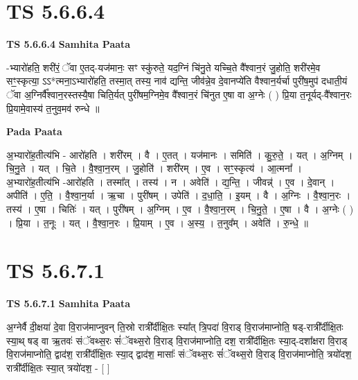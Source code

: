 \documentclass[17pt]{extarticle}
\begin{document}
\section*{ TS 5.6.6.4 }

\textbf{TS 5.6.6.4 } \newline
\textbf{Samhita Paata} \newline

-भ्यारो॑हति॒ शरी॑रं॒ ॅवा ए॒तद्-यज॑मानः॒ सꣳ स्कु॑रुते॒ यद॒ग्निं चि॑नु॒ते यच्चि॒ते वै᳚श्वान॒रं जु॒होति॒ शरी॑रमे॒व सꣳ॒॒स्कृत्या॒ ऽऽ*त्मना॒ऽभ्यारो॑हति॒ तस्मा॒त् तस्य॒ नाव॑ द्यन्ति॒ जीव॑न्ने॒व दे॒वानप्ये॑ति वैश्वान॒र्यर्चा पुरी॑ष॒मुप॑ दधाती॒यं ॅवा अ॒ग्निर्वै᳚श्वान॒रस्तस्यै॒षा चिति॒र्यत् पुरी॑षम॒ग्निमे॒व वै᳚श्वान॒रं चि॑नुत ए॒षा वा अ॒ग्नेः ( ) प्रि॒या त॒नूर्यद्-वै᳚श्वान॒रः प्रि॒यामे॒वास्य॑ त॒नुव॒मव॑ रुन्धे ॥ \newline

\textbf{Pada Paata} \newline

अ॒भ्यारो॑ह॒तीत्य॑भि - आरो॑हति । शरी॑रम् । वै । ए॒तत् । यज॑मानः । समिति॑ । कु॒रु॒ते॒ । यत् । अ॒ग्निम् । चि॒नु॒ते । यत् । चि॒ते । वै॒श्वा॒न॒रम् । जु॒होति॑ । शरी॑रम् । ए॒व । सꣳ॒॒स्कृत्य॑ । आ॒त्मना᳚ । अ॒भ्यारो॑ह॒तीत्य॑भि -आरो॑हति । तस्मा᳚त् । तस्य॑ । न । अवेति॑ । द्य॒न्ति॒ । जीवन्न्॑ । ए॒व । दे॒वान् । अपीति॑ । ए॒ति॒ । वै॒श्वा॒न॒र्या । ऋ॒चा । पुरी॑षम् । उपेति॑ । द॒धा॒ति॒ । इ॒यम् । वै । अ॒ग्निः । वै॒श्वा॒न॒रः । तस्य॑ । ए॒षा । चितिः॑ । यत् । पुरी॑षम् । अ॒ग्निम् । ए॒व । वै॒श्वा॒न॒रम् । चि॒नु॒ते॒ । ए॒षा । वै । अ॒ग्नेः ( ) । प्रि॒या । त॒नूः । यत् । वै॒श्वा॒न॒रः । प्रि॒याम् । ए॒व । अ॒स्य॒ । त॒नुव᳚म् । अवेति॑ । रु॒न्धे॒ ॥  \newline




\section*{ TS 5.6.7.1 }

\textbf{TS 5.6.7.1 } \newline
\textbf{Samhita Paata} \newline

अ॒ग्नेर्वै दी॒क्षया॑ दे॒वा वि॒राज॑माप्नुवन् ति॒स्रो रात्री᳚र्दीक्षि॒तः स्या᳚त् त्रि॒पदा॑ वि॒राड् वि॒राज॑माप्नोति॒ षड्-रात्री᳚र्दीक्षि॒तः स्या॒थ् षड् वा ऋ॒तवः॑ संॅवथ्स॒रः सं॑ॅवथ्स॒रो वि॒राड् वि॒राज॑माप्नोति॒ दश॒ रात्री᳚र्दीक्षि॒तः स्या॒द्-दशा᳚क्षरा वि॒राड् वि॒राज॑माप्नोति॒ द्वाद॑श॒ रात्री᳚र्दीक्षि॒तः स्या॒द् द्वाद॑श॒ मासाः᳚ संॅवथ्स॒रः सं॑ॅवथ्स॒रो वि॒राड् वि॒राज॑माप्नोति॒ त्रयो॑दश॒ रात्री᳚र्दीक्षि॒तः स्या॒त् त्रयो॑दश॒ - [  ] \newline
\end{document}
